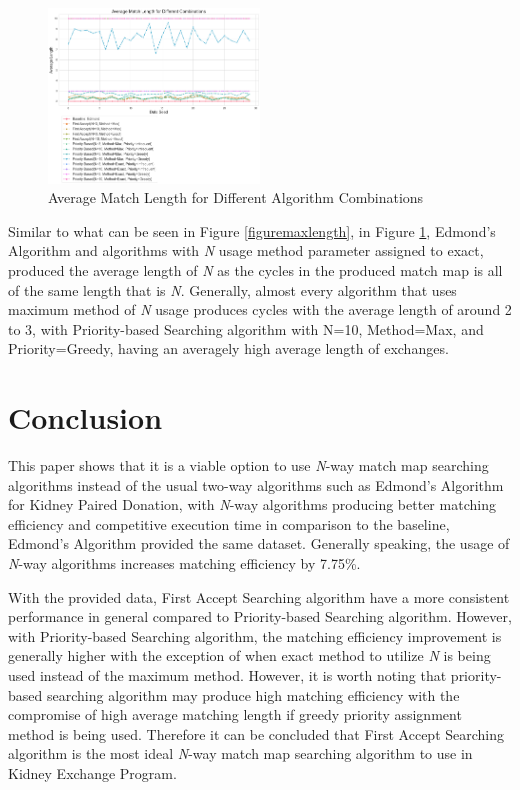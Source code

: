 \documentclass[conference]{IEEEtran}
\begin{document}
\begin{figure}[h]
    \includegraphics[width=0.5\textwidth]{images/average_match_length_for_different_combinations.png}
    \caption{Average Match Length for Different Algorithm Combinations}
    \label{figureavglength}
\end{figure}

Similar to what can be seen in Figure \ref{figuremaxlength}, in Figure \ref{figureavglength}, Edmond's Algorithm and algorithms with
\textit{N} usage method parameter assigned to exact, produced the average length of \textit{N} as the cycles in the produced match map is all
of the same length that is \textit{N}. Generally, almost every algorithm that uses maximum method of \textit{N} usage produces cycles with the
average length of around 2 to 3, with Priority-based Searching algorithm with N=10, Method=Max, and Priority=Greedy, having an averagely high
average length of exchanges.

\section{Conclusion}
This paper shows that it is a viable option to use \textit{N}-way match map searching algorithms instead of the usual two-way
algorithms such as Edmond's Algorithm for Kidney Paired Donation, with \textit{N}-way algorithms producing better matching efficiency
and competitive execution time in comparison to the baseline, Edmond's Algorithm provided the same dataset. Generally speaking,
the usage of \textit{N}-way algorithms increases matching efficiency by 7.75\%.

With the provided data, First Accept Searching algorithm have a more consistent performance in general compared to Priority-based Searching
algorithm. However, with Priority-based Searching algorithm, the matching efficiency improvement is generally higher with the exception of
when exact method to utilize \textit{N} is being used instead of the maximum method. However, it is worth noting that priority-based searching
algorithm may produce high matching efficiency with the compromise of high average matching length if greedy priority assignment method is being
used. Therefore it can be concluded that First Accept Searching algorithm is the most ideal \textit{N}-way match map searching algorithm to use
in Kidney Exchange Program. 
\end{document}
